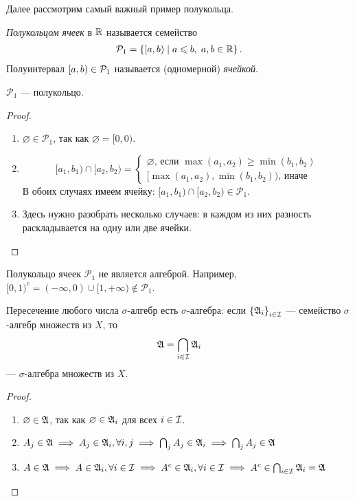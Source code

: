 Далее рассмотрим самый важный пример полукольца.

\begin{df}
 \textit{Полукольцом ячеек} в $\mathbb{R}$ называется семейство 
 \begin{align*}
  \mathcal{P}_1 = \left\{ [a, b) \mid a \leqslant b,\; a, b \in \mathbb{R} \right\} 
 .\end{align*} Полуинтервал $[a, b) \in \mathcal{P}_1$ называется (одномерной) \textit{ячейкой}.
\end{df}
\begin{lm}
 $ \mathcal{P}_1 $ --- полукольцо.
\end{lm}
\begin{proof}\
 \begin{enumerate}
  \item $ \varnothing \in \mathcal{P}_1 $, так как $ \varnothing = [0, 0) $.
  \item $$
   [a_1, b_1) \cap [a_2, b_2) = 
   \begin{cases}
    \varnothing \text{, если } \max(a_1, a_2) \geqslant \min(b_1, b_2) \\
    [\max(a_1, a_2), \min(b_1, b_2) ) \text{, иначе}
   \end{cases}
   $$
   В обоих случаях имеем ячейку: $[a_1, b_1) \cap [a_2, b_2) \in \mathcal{P}_1 $.
  \item Здесь нужно разобрать несколько случаев: в каждом из них разность раскладывается на одну или две ячейки.
 \end{enumerate}
\end{proof}
\begin{remrk*}
 Полукольцо ячеек $ \mathcal{P}_1 $ не является алгеброй.
 Например, $ [0, 1)^c = (-\infty, 0) \cup [1, +\infty) \not \in  \mathcal{P}_1 $.
\end{remrk*}
\begin{lm}
 Пересечение любого числа $\sigma$-алгебр есть $\sigma$-алгебра: если $\left\{\mathfrak{A}_i\right\}_{i \in \mathcal{I}}$  --- семейство $\sigma$-алгебр множеств из $X$, то
 \begin{align*}
  \mathfrak{A} = \bigcap_{i \in \mathcal{I}} \mathfrak{A}_i
 \end{align*} --- $\sigma$-алгебра множеств из $X$.
\end{lm}
\begin{proof}\
 \begin{enumerate}
  \item $ \varnothing \in \mathfrak{A} $, так как $ \varnothing \in \mathfrak{A}_i $ для всех $ i \in \mathcal{I} $.
  \item $ A_j \in \mathfrak{A} \;\Longrightarrow\; A_j \in \mathfrak{A}_i, \forall i, j  \;\Longrightarrow\; \bigcap_j A_j \in 
   \mathfrak{A}_i \;\Longrightarrow\; \bigcap_j A_j \in \mathfrak{A}$
  \item $ A \in \mathfrak{A} \;\Longrightarrow\; A \in \mathfrak{A}_i,  \forall i \in \mathcal{I} \;\Longrightarrow\; A^c \in \mathfrak{A}_i, \forall i \in \mathcal{I} \;\Longrightarrow\; A^c \in \bigcap_{i \in \mathcal{I}} \mathfrak{A}_i = \mathfrak{A}$ 
 \end{enumerate}
\end{proof}
